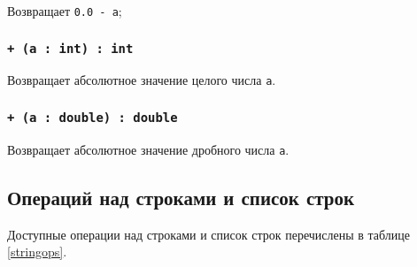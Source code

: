 Возвращает \texttt{0.0 - a};

\subsubsection{\texttt{+ (a : int) : int}}

Возвращает абсолютное значение целого числа \texttt{a}.

\subsubsection{\texttt{+ (a : double) : double}}

Возвращает абсолютное значение дробного числа \texttt{a}.

\subsection{Операций над строками и список строк}

Доступные операции над строками и список строк перечислены в таблице \ref{stringops}.

